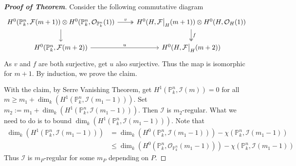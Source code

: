 \documentclass{ctexart}
\begin{document}
\begin{proof}[\textbf{\emph{Proof of Theorem}}]
    Consider the following commutative diagram
    \begin{equation*}
        \begin{tikzcd}
            H^{0}(\mathbb{P}_{k}^{n}, \mathcal{F}(m + 1)) \otimes H^{0}(\mathbb{P}_{k}^{n}, \mathcal{O}_{\mathbb{P}_{k}^{n}}(1)) \arrow[r, twoheadrightarrow, "v"] \arrow[d] &
            H^{0}(H, \mathcal{F}\big{|}_{H}(m + 1)) \otimes H^{0}(H, \mathcal{O}_{H}(1)) \arrow[d, twoheadrightarrow, "f"] \\
            H^{0}(\mathbb{P}_{k}^{n}, \mathcal{F}(m + 2)) \arrow[r, "u"] &
            H^{0}(H, \mathcal{F}\big{|}_{H}(m + 2))
        \end{tikzcd}
    \end{equation*}
    As $v$ and $f$ are both surjective, get $u$ also surjective.
    Thus the map is isomorphic for $m + 1$.
    By induction, we prove the claim.
    \par
    With the claim, by Serre Vanishing Theorem, get $H^{1}(\mathbb{P}_{k}^{n}, \mathcal{I}(m)) = 0$ for all $m \ge m_{1} + \dim_{k}(H^{1}(\mathbb{P}_{k}^{n}, \mathcal{I}(m_{1} - 1)))$.
    Set $m_{2} := m_{1} + \dim_{k}(H^{1}(\mathbb{P}_{k}^{n}, \mathcal{I}(m_{1} - 1)))$.
    Then $\mathcal{I}$ is $m_{2}$-regular.
    What we need to do is to bound $\dim_{k}(H^{1}(\mathbb{P}_{k}^{n}, \mathcal{I}(m_{1} - 1)))$.
    Note that 
    \begin{equation*}
        \begin{split}
            \dim_{k}(H^{1}(\mathbb{P}_{k}^{n}, \mathcal{I}(m_{1} - 1))) & = \dim_{k}(H^{0}(\mathbb{P}_{k}^{n}, \mathcal{I}(m_{1} - 1))) - \chi(\mathbb{P}_{k}^{n}, \mathcal{I}(m_{1} - 1)) \\
            & \le \dim_{k}(H^{0}(\mathbb{P}_{k}^{n}, \mathcal{O}_{\mathbb{P}_{k}^{n}}(m_{1} - 1))) - \chi(\mathbb{P}_{k}^{n}, \mathcal{I}(m_{1} - 1))
        \end{split}
    \end{equation*}
    Thus $\mathcal{I}$ is $m_{P}$-regular for some $m_{P}$ depending on $P$.
\end{proof}
\end{document}
